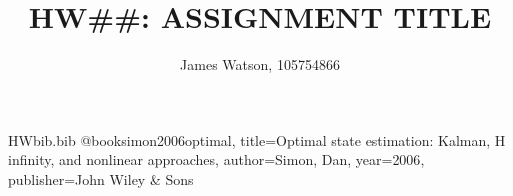 \begin{filecontents}{HWbib.bib}
@book{simon2006optimal,
  title={Optimal state estimation: Kalman, H infinity, and nonlinear approaches},
  author={Simon, Dan},
  year={2006},
  publisher={John Wiley \& Sons}
}
\end{filecontents}


\documentclass{hw_grad}








\title{HW\#\#: ASSIGNMENT TITLE}
\author{James Watson, 105754866}


	\maketitle
	
	
	
	
    
	
